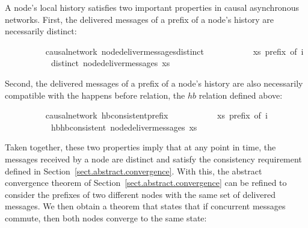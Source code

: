 \documentclass[acmlarge,review,anonymous]{acmart}\settopmatter{printfolios=true}
\begin{document}
A node's local history satisfies two important properties in causal asynchronous networks.
First, the delivered messages of a prefix of a node's history are necessarily distinct:
\\
\begin{isabellebody}
\ \ \ \ \ \ \ \  {\isacharparenleft}\ causal{\isacharunderscore}network{\isacharparenright}\ node{\isacharunderscore}deliver{\isacharunderscore}messages{\isacharunderscore}distinct{\isacharcolon}\isanewline
\ \ \ \ \ \ \ \ \ \ \ {\isachardoublequoteopen}xs\ prefix\ of\ i{\isachardoublequoteclose}\isanewline
\ \ \ \ \ \ \ \ \ \ \ {\isachardoublequoteopen}distinct\ {\isacharparenleft}node{\isacharunderscore}deliver{\isacharunderscore}messages\ xs{\isacharparenright}{\isachardoublequoteclose}
\end{isabellebody}
\vspace{\baselineskip}
Second, the delivered messages of a prefix of a node's history are also necessarily compatible with the happens before relation, the $hb$ relation defined above:
\\
\begin{isabellebody}
\ \ \ \ \ \ \ \  {\isacharparenleft}\ causal{\isacharunderscore}network{\isacharparenright}\ hb{\isacharunderscore}consistent{\isacharunderscore}prefix{\isacharcolon}\isanewline
\ \ \ \ \ \ \ \ \ \ \ {\isachardoublequoteopen}xs\ prefix\ of\ i{\isachardoublequoteclose}\isanewline
\ \ \ \ \ \ \ \ \ \ \ {\isachardoublequoteopen}hb{\isachardot}hb{\isacharunderscore}consistent\ {\isacharparenleft}node{\isacharunderscore}deliver{\isacharunderscore}messages\ xs{\isacharparenright}{\isachardoublequoteclose}
\end{isabellebody}
\vspace{\baselineskip}
Taken together, these two properties imply that at any point in time, the messages received by a node are distinct and satisfy the consistency requirement defined in Section~\ref{sect.abstract.convergence}.
With this, the abstract convergence theorem of Section~\ref{sect.abstract.convergence} can be refined to consider the prefixes of two different nodes with the same set of delivered messages.
We then obtain a theorem that states that if concurrent messages commute, then both nodes converge to the same state:
\\
\end{document}
